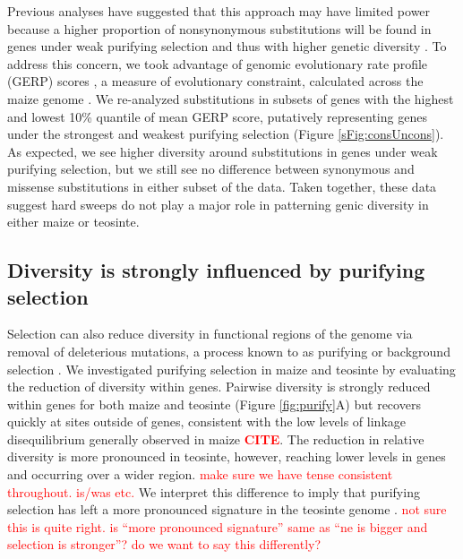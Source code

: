 \documentclass{pnastwo}
\newcommand{\jri}[1]{\textcolor{red}{\scriptsize #1}}
\newcommand{\citex}{\textcolor{red}{\bf CITE}}
\begin{document}
\begin{article}
Previous analyses have suggested that this approach may have limited power because a higher proportion of nonsynonymous substitutions will be found in genes under weak purifying selection and thus with higher genetic diversity \cite{enard2014}. 
To address this concern, we took advantage of genomic evolutionary rate profile (GERP) scores \cite{davydov2010}, a measure of evolutionary constraint, calculated across the maize genome \cite{rodgers2015}. 
We re-analyzed substitutions in subsets of genes with the highest and lowest 10\% quantile of mean GERP score, putatively representing genes under the strongest and weakest purifying selection  (Figure \ref{sFig:consUncons}). 
As expected, we see higher diversity around substitutions in genes under weak purifying selection, but we still see no difference between synonymous and missense substitutions in either subset of the data.
Taken together, these data suggest hard sweeps do not play a major role in patterning genic diversity in either maize or teosinte.

\subsection{Diversity is strongly influenced by purifying selection}

Selection can also reduce diversity in functional regions of the genome via removal of deleterious mutations, a process known to as purifying or background selection \cite{charlesworth1993}.
We investigated purifying selection in maize and teosinte by evaluating the reduction of diversity within genes.
Pairwise diversity is strongly reduced within genes for both maize and teosinte (Figure \ref{fig:purify}A) but recovers quickly at sites outside of genes, consistent with the low levels of linkage disequilibrium generally observed in maize \citex. 
The reduction in relative diversity is more pronounced in teosinte, however, reaching lower levels in genes and occurring over a wider region.  \jri{make sure we have tense consistent throughout. is/was etc.}
We interpret this difference to imply that purifying selection has left a more pronounced signature in the teosinte genome . \jri{not sure this is quite right. is ``more pronounced signature'' same as ``ne is bigger and selection is stronger''? do we want to say this differently?}


\end{article}
\end{document}
